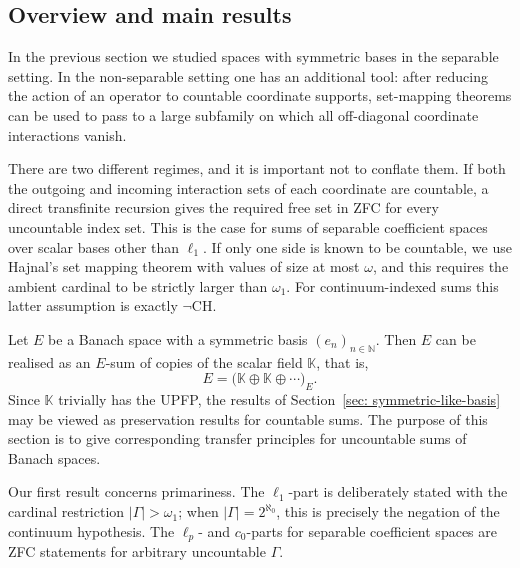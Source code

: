 \documentclass[11pt]{amsart}
\theoremstyle{plain}
\theoremstyle{definition}
\numberwithin{equation}{section}
\newcommand{\abs}[1]{\left|#1\right|}
\newcommand{\CH}{\mathrm{CH}}
\begin{document}
\subsection{Overview and main results}

In the previous section we studied spaces with symmetric bases in the separable setting.  In the non-separable setting one has an additional tool: after reducing the action of an operator to countable coordinate supports, set-mapping theorems can be used to pass to a large subfamily on which all off-diagonal coordinate interactions vanish.

There are two different regimes, and it is important not to conflate them.  If both the outgoing and incoming interaction sets of each coordinate are countable, a direct transfinite recursion gives the required free set in ZFC for every uncountable index set.  This is the case for sums of separable coefficient spaces over scalar bases other than \(\ell_1\).  If only one side is known to be countable, we use Hajnal's set mapping theorem with values of size at most \(\omega\), and this requires the ambient cardinal to be strictly larger than \(\omega_1\).  For continuum-indexed sums this latter assumption is exactly \(\neg\CH\).

Let \(E\) be a Banach space with a symmetric basis \((e_n)_{n \in \mathbb{N}}\).  Then \(E\) can be realised as an \(E\)-sum of copies of the scalar field \(\mathbb{K}\), that is,
\begin{equation*}
E = \bigl(\mathbb{K} \oplus \mathbb{K} \oplus \cdots \bigr)_E.
\end{equation*}
Since \(\mathbb{K}\) trivially has the UPFP, the results of Section~\ref{sec: symmetric-like-basis} may be viewed as preservation results for countable sums.  The purpose of this section is to give corresponding transfer principles for uncountable sums of Banach spaces.

Our first result concerns primariness.  The \(\ell_1\)-part is deliberately stated with the cardinal restriction \(\abs{\Gamma}>\omega_1\); when \(\abs{\Gamma}=2^{\aleph_0}\), this is precisely the negation of the continuum hypothesis.  The \(\ell_p\)- and \(c_0\)-parts for separable coefficient spaces are ZFC statements for arbitrary uncountable \(\Gamma\).
\end{document}
